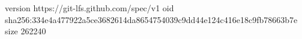 version https://git-lfs.github.com/spec/v1
oid sha256:334e4a477922a5ce3682614da8654754039c9dd44e124c416e18c9fb78663b7e
size 262240
